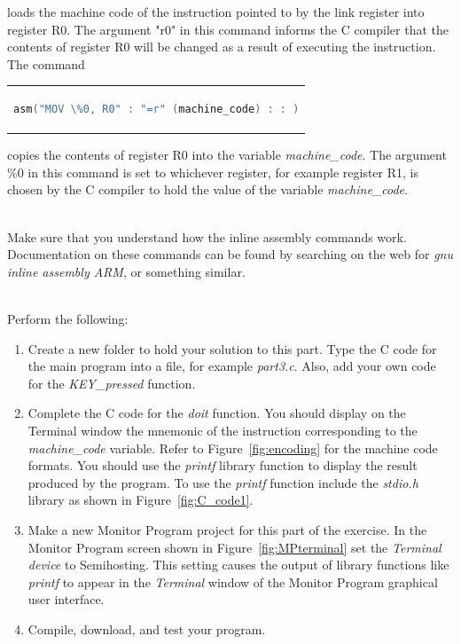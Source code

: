 \documentclass[epsfig,10pt,fullpage]{article}
\begin{document}
\noindent
loads the machine code of the instruction pointed to by the link register into register R0. The 
argument "r0" in this command informs the C compiler that the contents of register R0 will be 
changed as a result of executing the instruction. The command

\begin{center}
\begin{tabular}{c}
\begin{lstlisting}[language=C]
asm("MOV \%0, R0" : "=r" (machine_code) : : )
\end{lstlisting}
\end{tabular}
\end{center}

\noindent
copies the contents of register R0 into the variable {\it machine\_code}. The argument {\sf \%0}
in this command is set to whichever register, for example register R1, is chosen by the C
compiler to hold the value of the variable {\it machine\_code}.  

~\\
\noindent
Make sure that you understand how the inline assembly commands work. Documentation on
these commands can be found by searching on the web for {\it gnu inline assembly ARM}, or
something similar.

~\\
\noindent
Perform the following:

\begin{enumerate}
\item
Create a new folder to hold your solution to this part. 
Type the C code for the main program into a file, for example {\it part3.c}. Also, add
your own code for the {\it KEY\_pressed} function.

\item 
Complete the C code for the {\it doit} function. You should display on the Terminal window
the mnemonic of the instruction corresponding to the {\it machine\_code} variable.
Refer to Figure~\ref{fig:encoding} for the machine code formats.
You should use the {\it printf} library function to display the result produced by the program. 
To use the {\it printf} function include the {\it stdio.h} library as shown in
Figure~\ref{fig:C_code1}.

\item
Make a new Monitor Program project for this part of the exercise. In the Monitor Program screen 
shown in Figure~\ref{fig:MPterminal} set the {\it Terminal device} to {\sf Semihosting}.
This setting causes the output of library functions like {\it printf} to appear 
in the {\it Terminal} window of the Monitor Program graphical user interface.

\item
Compile, download, and test your program. 
\end{enumerate}
\end{document}
